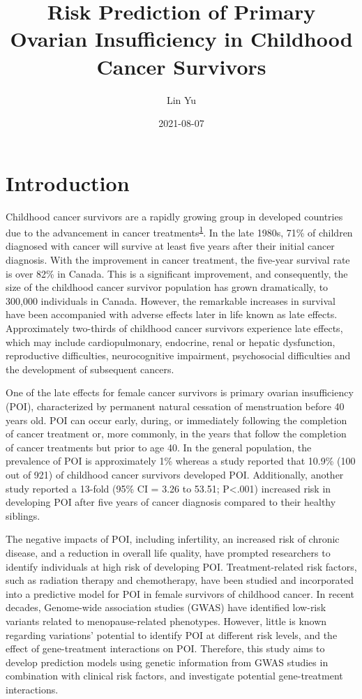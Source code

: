 \documentclass[
]{book}
\title{Risk Prediction of Primary Ovarian Insufficiency in Childhood Cancer Survivors}
\author{Lin Yu}
\date{2021-08-07}
\begin{document}
\maketitle

{
\setcounter{tocdepth}{1}
\tableofcontents
}
\hypertarget{introduction}{%
\chapter*{Introduction}\label{introduction}}

Childhood cancer survivors are a rapidly growing group in developed countries due to the advancement in cancer treatments\textsuperscript{\protect\hyperlink{ref-lund2011}{1}}. In the late 1980s, 71\% of children diagnosed with cancer will survive at least five years after their initial cancer diagnosis. With the improvement in cancer treatment, the five-year survival rate is over 82\% in Canada. This is a significant improvement, and consequently, the size of the childhood cancer survivor population has grown dramatically, to 300,000 individuals in Canada. However, the remarkable increases in survival have been accompanied with adverse effects later in life known as late effects. Approximately two-thirds of childhood cancer survivors experience late effects, which may include cardiopulmonary, endocrine, renal or hepatic dysfunction, reproductive difficulties, neurocognitive impairment, psychosocial difficulties and the development of subsequent cancers.

One of the late effects for female cancer survivors is primary ovarian insufficiency (POI), characterized by permanent natural cessation of menstruation before 40 years old. POI can occur early, during, or immediately following the completion of cancer treatment or, more commonly, in the years that follow the completion of cancer treatments but prior to age 40. In the general population, the prevalence of POI is approximately 1\% whereas a study reported that 10.9\% (100 out of 921) of childhood cancer survivors developed POI. Additionally, another study reported a 13-fold (95\% CI = 3.26 to 53.51; P\textless.001) increased risk in developing POI after five years of cancer diagnosis compared to their healthy siblings.

The negative impacts of POI, including infertility, an increased risk of chronic disease, and a reduction in overall life quality, have prompted researchers to identify individuals at high risk of developing POI. Treatment-related risk factors, such as radiation therapy and chemotherapy, have been studied and incorporated into a predictive model for POI in female survivors of childhood cancer. In recent decades, Genome-wide association studies (GWAS) have identified low-risk variants related to menopause-related phenotypes. However, little is known regarding variations' potential to identify POI at different risk levels, and the effect of gene-treatment interactions on POI. Therefore, this study aims to develop prediction models using genetic information from GWAS studies in combination with clinical risk factors, and investigate potential gene-treatment interactions.
\end{document}

